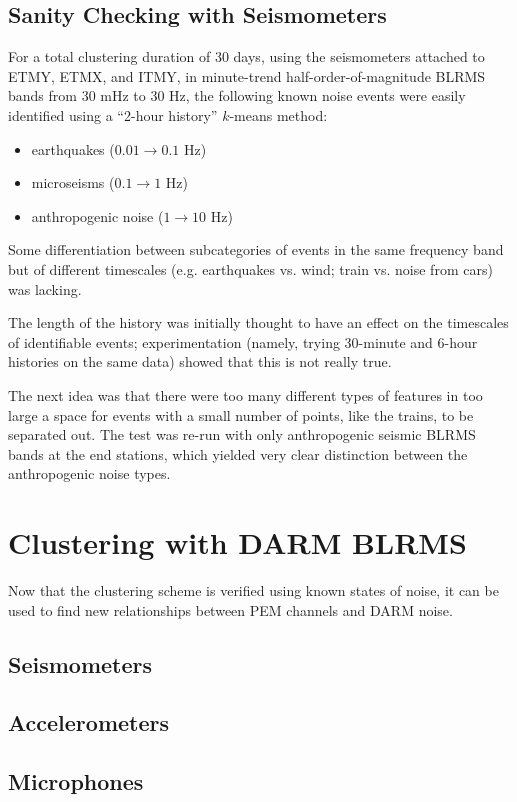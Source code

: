 \documentclass[colorlinks=true,pdfstartview=FitV,linkcolor=blue,
            citecolor=red,urlcolor=magenta]{ligodoc}
\begin{document}
\subsection{Sanity Checking with Seismometers}
For a total clustering duration of 30 days, using the seismometers attached to ETMY, ETMX, and ITMY, in minute-trend half-order-of-magnitude BLRMS bands from 30 mHz to 30 Hz, the following known noise events were easily identified using a ``2-hour history'' $k$-means method:
\begin{itemize}
\item earthquakes ($0.01\to0.1$ Hz)
\item microseisms ($0.1\to1$ Hz)
\item anthropogenic noise ($1\to10$ Hz)
\end{itemize}

Some differentiation between subcategories of events in the same frequency band but of different timescales (e.g. earthquakes vs. wind; train vs. noise from cars) was lacking.

The length of the history was initially thought to have an effect on the timescales of identifiable events; experimentation (namely, trying 30-minute and 6-hour histories on the same data) showed that this is not really true.

The next idea was that there were too many different types of features in too large a space for events with a small number of points, like the trains, to be separated out.
The test was re-run with only anthropogenic seismic BLRMS bands at the end stations, which yielded very clear distinction between the anthropogenic noise types.

\section{Clustering with DARM BLRMS}
Now that the clustering scheme is verified using known states of noise, it can be used to find new relationships between PEM channels and DARM noise.

\subsection{Seismometers}

\subsection{Accelerometers}

\subsection{Microphones}
\end{document}
